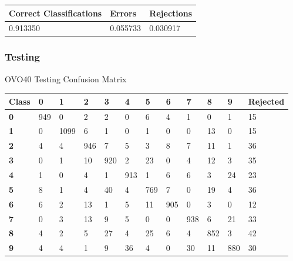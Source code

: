 \documentclass[
  a4paper,            %
  DIV=10,             %
  oneside,            %
  BCOR=5mm,           %
  parskip=half,       %
  numbers=noenddot,   %
  bibtotoc,           %
  listof=totoc,        %
  article
]{scrreprt}
\begin{document}
\begin{center}
  \begin{tabular}{|p{5cm}|p{3cm}|p{3cm}|}
    \hline
    \textbf{Correct Classifications} & \textbf{Errors} & \textbf{Rejections} \\
    \hline
    0.913350 & 0.055733 & 0.030917 \\
    \hline
  \end{tabular}
\end{center}
\subsubsection{Testing}
\begin{center}
  \small{OVO40 Testing Confusion Matrix}
  \begin{tabular}{|p{1cm}|p{1cm}|p{1cm}|p{1cm}|p{1cm}|p{1cm}|p{1cm}|p{1cm}|p{1cm}|p{1cm}|p{1cm}|p{1.7cm}|}
    \hline
    \textbf{Class} & \textbf{0} & \textbf{1} & \textbf{2} & \textbf{3} & \textbf{4} & \textbf{5} & \textbf{6} & \textbf{7} & \textbf{8} & \textbf{9} & \textbf{Rejected} \\
    \hline
    \textbf{0} & 949 & 0 & 2 & 2 & 0 & 6 & 4 & 1 & 0 & 1 & 15 \\
    \hline
    \textbf{1} & 0 & 1099 & 6 & 1 & 0 & 1 & 0 & 0 & 13 & 0 & 15 \\
    \hline
    \textbf{2} & 4 & 4 & 946 & 7 & 5 & 3 & 8 & 7 & 11 & 1 & 36 \\
    \hline
    \textbf{3} & 0 & 1 & 10 & 920 & 2 & 23 & 0 & 4 & 12 & 3 & 35 \\
    \hline
    \textbf{4} & 1 & 0 & 4 & 1 & 913 & 1 & 6 & 6 & 3 & 24 & 23 \\
    \hline
    \textbf{5} & 8 & 1 & 4 & 40 & 4 & 769 & 7 & 0 & 19 & 4 & 36 \\
    \hline
    \textbf{6} & 6 & 2 & 13 & 1 & 5 & 11 & 905 & 0 & 3 & 0 & 12 \\
    \hline
    \textbf{7} & 0 & 3 & 13 & 9 & 5 & 0 & 0 & 938 & 6 & 21 & 33 \\
    \hline
    \textbf{8} & 4 & 2 & 5 & 27 & 4 & 25 & 6 & 4 & 852 & 3 & 42 \\
    \hline
    \textbf{9} & 4 & 4 & 1 & 9 & 36 & 4 & 0 & 30 & 11 & 880 & 30 \\
    \hline
  \end{tabular}
\end{center}
\end{document}
